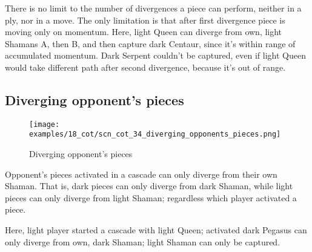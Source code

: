 \vspace*{-0.5\baselineskip}
There is no limit to the number of divergences a piece can perform, neither in a ply,
nor in a move. The only limitation is that after first divergence piece is moving
only on momentum. \newline
\indent
Here, light Queen can diverge from own, light Shamans A, then B, and then capture
dark Centaur, since it's within range of accumulated momentum. Dark Serpent couldn't
be captured, even if light Queen would take different path after second divergence,
because it's out of range.

\clearpage %

\subsection*{Diverging opponent's pieces}
\label{sec:Conquest of Tlalocan/Divergence/Diverging opponent's pieces}

\vspace*{-1.4\baselineskip}
\noindent
\begin{figure}[!h]
\texttt{[image: examples/18\_cot/scn\_cot\_34\_diverging\_opponents\_pieces.png]}
\vspace*{-1.3\baselineskip}
\caption{Diverging opponent's pieces}
\label{fig:scn_cot_34_diverging_opponents_pieces}
\end{figure}

\vspace*{-0.5\baselineskip}
Opponent's pieces activated in a cascade can only diverge from their own Shaman.
That is, dark pieces can only diverge from dark Shaman, while light pieces can only
diverge from light Shaman; regardless which player activated a piece.

Here, light player started a cascade with light Queen; activated dark Pegasus
can only diverge from own, dark Shaman; light Shaman can only be captured.

\clearpage %

